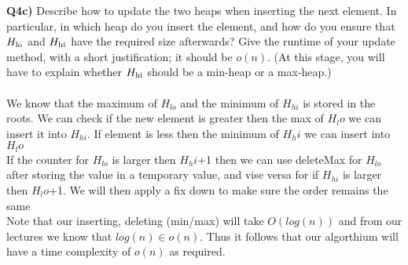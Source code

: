 \documentclass[12pt]{article}
\begin{document}
\begin{adjustwidth}{0em}{0pt}
\textbf{Q4c)} Describe how to update the two heaps when inserting the next element. In particular, in which heap do you insert the element, and how do you ensure that $H_{\rm lo}$ and $H_{\rm hi}$ have the required size
afterwards? Give the runtime of your update method, with a short
justification; it should be $o(n)$. (At this stage, you will have to explain whether $H_{\rm hi}$ should be a min-heap or a max-heap.) \\ \\
We know that the maximum of $H_{lo}$ and the minimum of $H_{hi}$ is stored in the roots. We can check if the new element is greater then the max of $H_lo$ we can insert it into $H_{hi}$. If element is less then the minimum of $H_hi$ we can insert into $H_lo$ \\

If the counter for $H_{lo}$ is larger then $H_hi$+1 then we can use deleteMax for $H_{lo}$ after storing the value in a temporary value, and vise versa for if $H_{hi}$ is larger then $H_lo$+1. We will then apply a fix down to make sure the order remains the same\\

Note that our inserting, deleting (min/max) will take $O(log(n))$ and from our lectures we know that $log(n) \in o(n)$. Thus it follows that our algorthium will have a time complexity of $o(n)$ as required.
\end{adjustwidth} 
\end{document}
